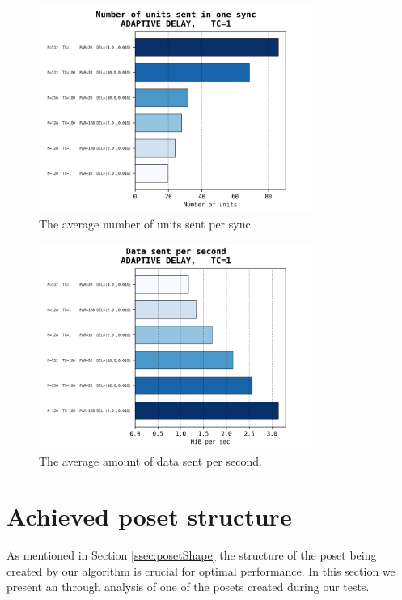 \documentclass[a4paper,10pt]{article}
\begin{document}
			\begin{figure}[h]
				\centering
				\includegraphics[width=0.8\textwidth]{bar_plots/big/units_sent_sync.png}
				\caption{The average number of units sent per sync.}
				\label{fig:bigUnitsPerSync}
			\end{figure}
			\begin{figure}[h]
				\centering
				\includegraphics[width=0.8\textwidth]{bar_plots/big/bytes_sent_per_sec.png}
				\caption{The average amount of data sent per second.}
				\label{fig:bigBps}
			\end{figure}
	\FloatBarrier
	\section{Achieved poset structure}
	\label{sec:structure}
	\FloatBarrier
	 As mentioned in Section \ref{ssec:posetShape} the structure of the poset being created by our algorithm is crucial for optimal performance.
		In this section we present an through analysis of one of the posets created during our tests.
\end{document}
